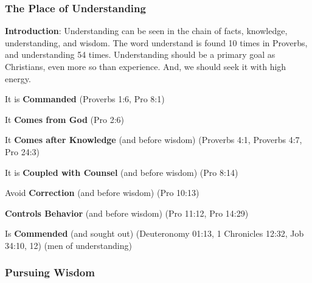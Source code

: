 \subsubsection{The Place of Understanding}

\textbf{Introduction}: Understanding can be seen in the chain of facts, knowledge, understanding, and wisdom. The word understand is found 10 times in Proverbs, and understanding 54 times. Understanding should be a primary goal as Christians, even more so than experience. And, we should seek it with high energy.%
\begin{compactenum}[I.][8]
	\item It is \textbf{Commanded} (Proverbs 1:6, Pro 8:1)
	\item It \textbf{Comes from God} (Pro 2:6)
	\item It \textbf{Comes after Knowledge} (and before wisdom) (Proverbs 4:1, Proverbs 4:7, Pro 24:3)
	\item It is \textbf{Coupled with Counsel} (and before wisdom) (Pro 8:14)
	\item Avoid \textbf{Correction} (and before wisdom) (Pro 10:13)
	\item \textbf{Controls Behavior} (and before wisdom) (Pro 11:12, Pro 14:29)
	\item Is \textbf{Commended} (and sought out) (Deuteronomy 01:13, 1 Chronicles 12:32, Job 34:10, 12) (men of understanding)
\end{compactenum}


\subsubsection{Pursuing Wisdom}

